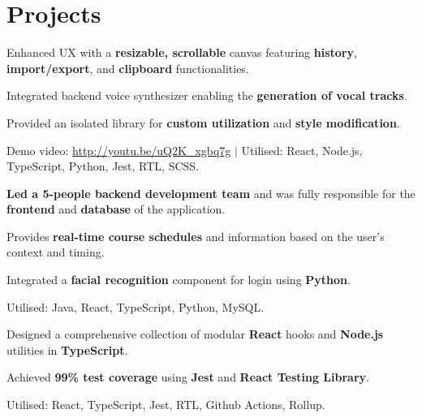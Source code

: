 \documentclass[a4paper,10pt]{article}
\begin{document}
\section{Projects}

\begin{tightitemize}
  \item Enhanced UX with a \textbf{resizable, scrollable} canvas featuring \textbf{history}, \textbf{import/export}, and \textbf{clipboard} functionalities.
  \item Integrated backend voice synthesizer enabling the \textbf{generation of vocal tracks}.
  \item Provided an isolated library for \textbf{custom utilization} and \textbf{style modification}.
  \item Demo video: \href{http://youtu.be/uQ2K\_xgbq7g}{\underline{http://youtu.be/uQ2K\_xgbq7g}} $|$ Utilised: React, Node.js, TypeScript, Python, Jest, RTL, SCSS.
\end{tightitemize}

\begin{tightitemize}
  \item \textbf{Led a 5-people backend development team} and was fully responsible for the \textbf{frontend} and \textbf{database} of the application.
  \item Provides \textbf{real-time course schedules} and information based on the user's context and timing.
  \item Integrated a \textbf{facial recognition} component for login using \textbf{Python}.
  \item Utilised: Java, React, TypeScript, Python, MySQL.
\end{tightitemize}

\begin{tightitemize}
  \item Designed a comprehensive collection of modular \textbf{React} hooks and \textbf{Node.js} utilities in \textbf{TypeScript}.
  \item Achieved \textbf{99\% test coverage} using \textbf{Jest} and \textbf{React Testing Library}.
  \item Utilised: React, TypeScript, Jest, RTL, Github Actions, Rollup.
\end{tightitemize}
\end{document}

